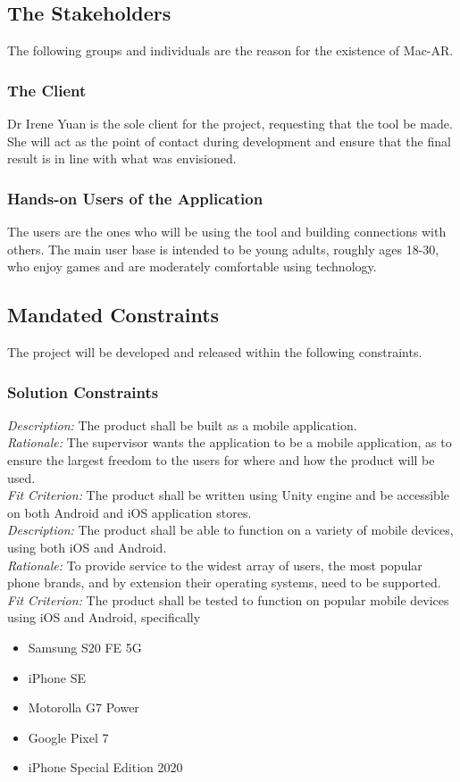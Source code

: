 \documentclass[12pt]{article}
\begin{document}
\subsection{The Stakeholders}
The following groups and individuals are the reason for the existence of Mac-AR. 

\subsubsection{The Client}
Dr Irene Yuan is the sole client for the project, requesting that the tool be made. She will act as the point of contact during development and ensure that the final result is in line with what was envisioned. 

\subsubsection{Hands-on Users of the Application}
The users are the ones who will be using the tool and building connections with others. The main user base is intended to be young adults, roughly ages 18-30, who enjoy games and are moderately comfortable using technology.

\subsection{Mandated Constraints}
The project will be developed and released within the following constraints. 

\subsubsection{Solution Constraints} \label{SolutionConstraints}
\emph{Description:} The product shall be built as a mobile application.\\
\emph{Rationale:} The supervisor wants the application to be a mobile application, as to ensure the largest freedom to the users for where and how the product will be used.\\
\emph{Fit Criterion:} The product shall be written using Unity engine and be accessible on both Android and iOS application stores.\\

\noindent
\emph{Description:} The product shall be able to function on a variety of mobile devices, using both iOS and Android.\\
\emph{Rationale:} To provide service to the widest array of users, the most popular phone brands, and by extension their operating systems, need to be supported.\\
\emph{Fit Criterion:} The product shall be tested to function on popular mobile devices using iOS and Android, specifically 
\begin{itemize}
	\item Samsung S20 FE 5G
    \item iPhone SE
    \item Motorolla G7 Power
    \item Google Pixel 7
    \item iPhone Special Edition 2020
\end{itemize}
\end{document}
